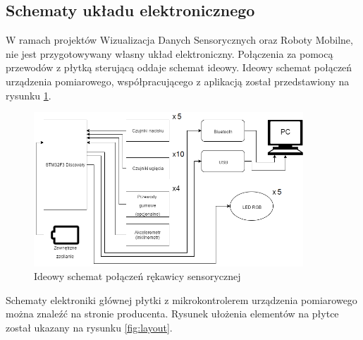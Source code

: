 \documentclass[10pt,a4paper]{article}
\begin{document}
\newpage
\subsection{Schematy układu elektronicznego}
W ramach projektów Wizualizacja Danych Sensorycznych oraz Roboty Mobilne, nie jest przygotowywany własny układ elektroniczny. Połączenia za pomocą przewodów z płytką sterującą oddaje schemat ideowy.
Ideowy schemat połączeń urządzenia pomiarowego, współpracującego z aplikacją został przedstawiony na rysunku \ref{fig:ideascheme}.
\begin{figure}[!htb]
\centering
\includegraphics[width=0.9\textwidth]{./SchematIdeowy.png}
\caption{Ideowy schemat połączeń rękawicy sensorycznej\label{fig:ideascheme}}
\end{figure}
Schematy elektroniki głównej płytki z mikrokontrolerem urządzenia pomiarowego można znaleźć na stronie producenta. Rysunek ułożenia elementów na płytce został ukazany na rysunku \ref{fig:layout}.
\end{document}

